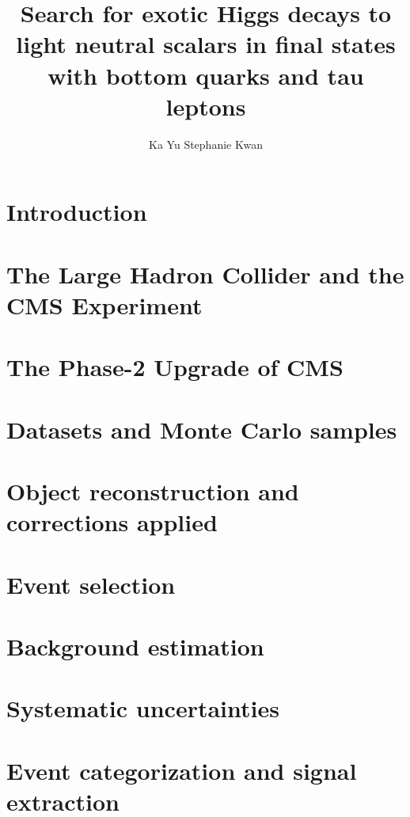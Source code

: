 \documentclass[12pt,lot,lof]{puthesis}
\title{Search for exotic Higgs decays to light neutral scalars in final states with bottom quarks and tau leptons}
\author{Ka Yu Stephanie Kwan}
\begin{document}
 
\chapter{Introduction}


\chapter{The Large Hadron Collider and the CMS Experiment}


\chapter{The Phase-2 Upgrade of CMS}
\label{chapter:ch-3:phase-2-upgrade-cms}


\chapter{Datasets and Monte Carlo samples}


\chapter{Object reconstruction and corrections applied}


\chapter{Event selection}


\chapter{Background estimation}
\label{chapter:ch-7:background-estimation}


\chapter{Systematic uncertainties}
\label{chapter:ch-8:systematic-uncertainties}


\chapter{Event categorization and signal extraction}
\label{chapter:ch-9:event-categorization-signal-extraction}

\end{document}
